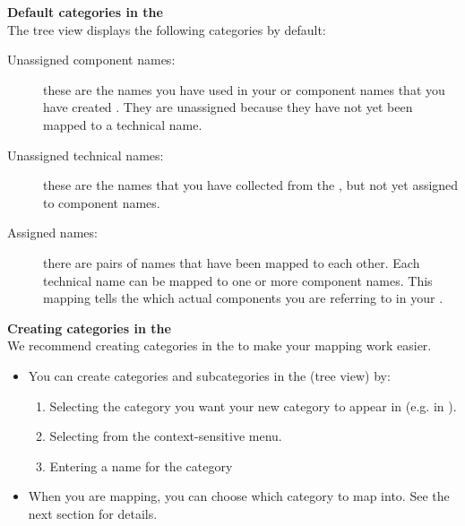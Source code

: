 
\textbf{Default categories in the \gdomeditor{}}\\
\label{TasksOMDefaultCats}
The \gdomeditor{} tree view displays the following categories by default:
\begin{description}
\item [Unassigned component names:]{these are the names you have used in your \gdcases{} or component names that you have created . They are unassigned because they have not yet been mapped to a technical name. }
\item [Unassigned technical names:]{these are the names that you have collected from the \gdaut{} , but not yet assigned to component names. }
\item [Assigned names:]{there are pairs of names that have been mapped to each other. Each technical name can be mapped to one or more component names. This mapping tells the \ite{} which actual components you are referring to in your \gdcases{}.}
\end{description}

\textbf{Creating categories in the \gdomeditor{}}\\
\label{omcats}
We recommend creating categories in the \gdomeditor{} to make your mapping work easier. 
\begin{itemize}
\item You can create categories and subcategories in the \gdomeditor{} (tree view) by:
\begin{enumerate}
\item Selecting the category you want your new category to appear in (e.g. in ).
\item Selecting  from the context-sensitive menu. 
\item Entering a name for the category
\end{enumerate}
\item When you are mapping, you can choose which category to map into. See the next section  for details.
\end{itemize}

